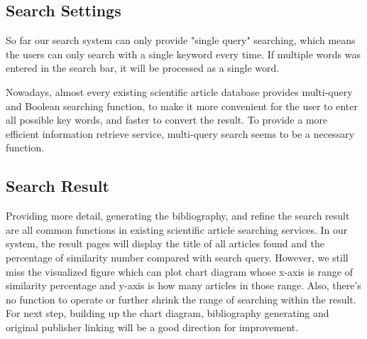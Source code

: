 \subsection{Search Settings}

So far our search system can only provide "single query" searching, which means the users can only search with a single keyword every time.
If multiple words was entered in the search bar, it will be processed as a single word.

Nowadays, almost every existing scientific article database provides multi-query and Boolean searching function,
to make it more convenient for the user to enter all possible key words,
and faster to convert the result.
To provide a more efficient information retrieve service,
multi-query search seems to be a necessary function.

\subsection{Search Result}
Providing more detail, generating the bibliography, and refine the search result are all common functions in existing scientific article searching services.
In our system, the result pages will display the title of all articles found and the percentage of similarity number compared with search query.
However, we still miss the visualized figure which can plot chart diagram whose x-axis is range of similarity percentage and y-axis is how many articles in those range.
Also, there's no function to operate or further shrink the range of searching within the result.
For next step,
building up the chart diagram, bibliography generating and original publisher linking will be a good direction for improvement.

